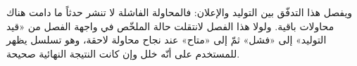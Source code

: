 \noindent ويفصل هذا التدفّق بين التوليد والإعلان: فالمحاولة الفاشلة لا تنشر حدثاً ما دامت هناك محاولات باقية. ولولا هذا الفصل لانتقلت حالة الملخّص في واجهة الفصل من «قيد التوليد» إلى «فشل» ثمّ إلى «متاح» عند نجاح محاولة لاحقة، وهو تسلسل يظهر للمستخدم على أنّه خلل وإن كانت النتيجة النهائية صحيحة.

